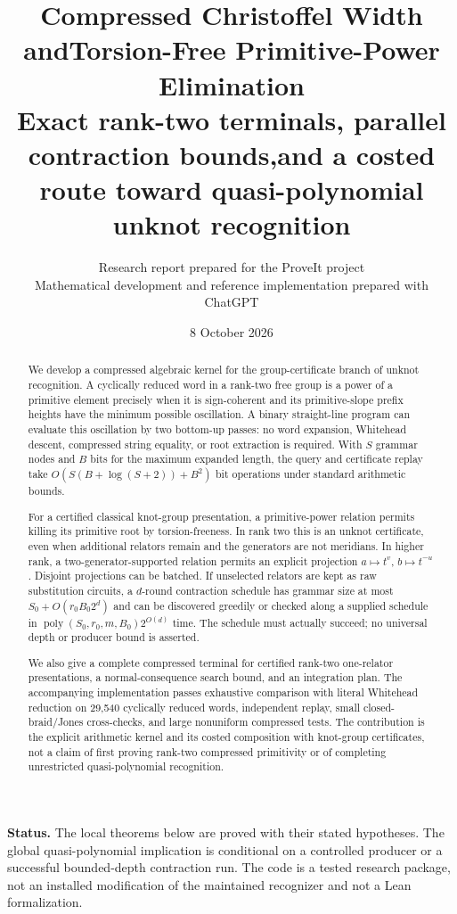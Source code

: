 \documentclass[11pt,letterpaper]{article}
\title{\textbf{Compressed Christoffel Width and\newline Torsion-Free Primitive-Power Elimination}\\[5pt]
\large Exact rank-two terminals, parallel contraction bounds,\newline and a costed route toward quasi-polynomial unknot recognition}
\author{Research report prepared for the ProveIt project\\
\small Mathematical development and reference implementation prepared with ChatGPT}
\date{8 October 2026}
\theoremstyle{definition}
\newcommand{\poly}{\operatorname{poly}}
\begin{document}
\maketitle
\begin{abstract}
We develop a compressed algebraic kernel for the group-certificate branch of
unknot recognition. A cyclically reduced word in a rank-two free group is a
power of a primitive element precisely when it is sign-coherent and its
primitive-slope prefix heights have the minimum possible oscillation. A binary
straight-line program can evaluate this oscillation by two bottom-up passes:
no word expansion, Whitehead descent, compressed string equality, or root
extraction is required. With $S$ grammar nodes and $B$ bits for the maximum
expanded length, the query and certificate replay take
$O(S(B+\log(S+2))+B^2)$ bit operations under standard arithmetic bounds.

For a certified classical knot-group presentation, a primitive-power relation
permits killing its primitive root by torsion-freeness. In rank two this is an
unknot certificate, even when additional relators remain and the generators
are not meridians. In higher rank, a two-generator-supported relation permits
an explicit projection $a\mapsto t^v$, $b\mapsto t^{-u}$. Disjoint projections
can be batched. If unselected relators are kept as raw substitution circuits,
a $d$-round contraction schedule has grammar size at most
$S_0+O(r_0B_0 2^d)$ and can be discovered greedily or checked along a supplied
schedule in $\poly(S_0,r_0,m,B_0)2^{O(d)}$ time. The schedule must actually
succeed; no universal depth or producer bound is asserted.

We also give a complete compressed terminal for certified rank-two one-relator
presentations, a normal-consequence search bound, and an integration plan.
The accompanying implementation passes exhaustive comparison with literal
Whitehead reduction on 29,540 cyclically reduced words, independent replay,
small closed-braid/Jones cross-checks, and large nonuniform compressed tests.
The contribution is the explicit arithmetic kernel and its costed composition
with knot-group certificates, not a claim of first proving rank-two compressed
primitivity or of completing unrestricted quasi-polynomial recognition.
\end{abstract}
\vspace{3pt}
\noindent\textbf{Status.} The local theorems below are proved with their stated
hypotheses. The global quasi-polynomial implication is conditional on a
controlled producer or a successful bounded-depth contraction run. The code
is a tested research package, not an installed modification of the maintained
recognizer and not a Lean formalization.
\clearpage
\tableofcontents
\clearpage
\end{document}
